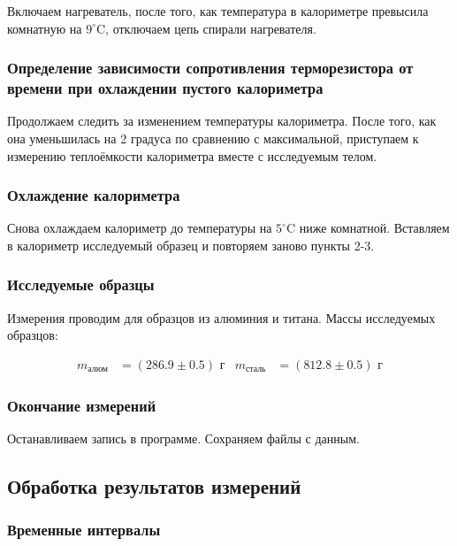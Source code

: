 \documentclass[a4paper]{article}
\begin{document}
        Включаем нагреватель, после того, как температура в калориметре превысила комнатную на $9^\circ\text{C}$, отключаем цепь спирали нагревателя.

    \subsubsection{Определение зависимости сопротивления терморезистора от времени при охлаждении пустого калориметра}

        Продолжаем следить за изменением температуры калориметра. После того, как она уменьшилась на 2 градуса по сравнению с максимальной, приступаем к измерению теплоёмкости калориметра вместе с исследуемым телом.

    \subsubsection{Охлаждение калориметра}

        Снова охлаждаем калориметр до температуры на $5^\circ\text{C}$ ниже комнатной. Вставляем в калориметр исследуемый образец и повторяем заново пункты 2-3.

    \subsubsection{Исследуемые образцы}

        Измерения проводим для образцов из алюминия и титана. Массы исследуемых образцов:

        \begin{align*}
            m_\text{алюм} &= (286.9 \pm 0.5) \text{ г} & m_\text{сталь} &= (812.8 \pm 0.5) \text{ г}
        \end{align*}

    \subsubsection{Окончание измерений}

        Останавливаем запись в программе. Сохраняем файлы с данным.

\subsection{Обработка результатов измерений}

\subsubsection{Временные интервалы}
\end{document}
